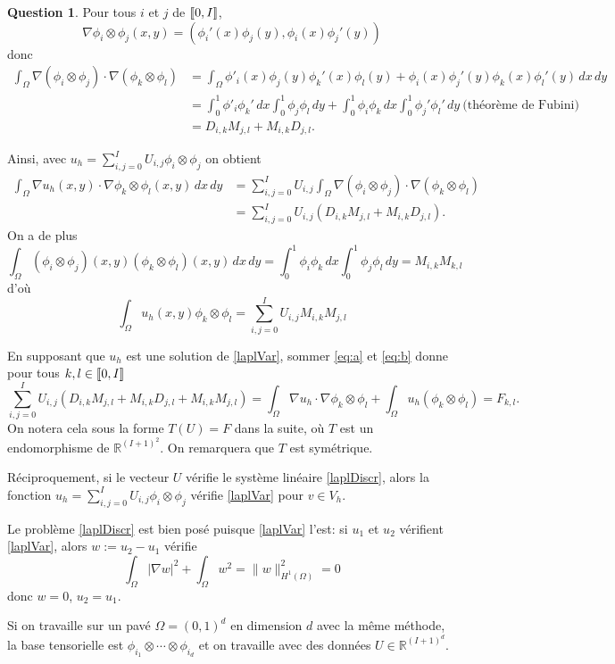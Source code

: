 \documentclass[11pt]{article}
\newcommand{\RR}{\mathbb{R}}
\DeclarePairedDelimiter{\zintcc}{[\![}{]\!]}
\theoremstyle{definition}
\newtheorem{ques}{Question}
\begin{document}
\begin{ques}
Pour tous $i$ et $j$ de $\zintcc{0,I}$,
\[
\nabla \phi_i\otimes\phi_j (x,y) = \left(
\phi_i'(x)\phi_j(y), \phi_i(x)\phi_j'(y)
\right)
\]
donc 
\begin{align*}
\int_{\Omega}\nabla(\phi_i\otimes\phi_j)\cdot\nabla(\phi_k\otimes\phi_l) 
&=
\int_{\Omega} \phi'_i(x)\phi_j(y)\phi_k'(x)\phi_l(y) + \phi_i(x)\phi_j'(y)\phi_k(x)\phi_l'(y)\,dx\,dy \\
&= \int_{0}^{1}\phi'_i\phi_k'\,dx\int_0^1\phi_j\phi_l\,dy + \int_{0}^{1}\phi_i\phi_k\,dx\int_0^1\phi_j'\phi_l'\,dy\ \text{(théorème de Fubini)} \\
&= D_{i,k}M_{j,l} + M_{i,k}D_{j,l}.
\end{align*}

Ainsi, avec $u_h = \sum_{i,j=0}^{I}U_{i,j}\phi_i\otimes\phi_j$ on obtient
\begin{align*}\tag{a}\label{eq:a}
\int_{\Omega} \nabla u_h(x,y)\cdot \nabla \phi_k\otimes\phi_l (x,y)\,dx\,dy 
&= \sum_{i,j=0}^{I}U_{i,j} \int_\Omega\nabla(\phi_i\otimes\phi_j)\cdot\nabla(\phi_k\otimes\phi_l) \\
&= \sum_{i,j=0}^{I}U_{i,j} (D_{i,k}M_{j,l}+M_{i,k}D_{j,l}).
\end{align*}
On a de plus
\[
\int_\Omega (\phi_i\otimes\phi_j)(x,y)(\phi_k\otimes\phi_l)(x,y)\,dx\,dy = \int_0^1 \phi_i \phi_k\,dx \int_0^1 \phi_j \phi_l\,dy = M_{i,k}M_{k,l}
\]
d'où
\begin{equation}\tag{b}\label{eq:b}
\int_\Omega u_h(x,y)\phi_k\otimes\phi_l = \sum_{i,j=0}^{I}U_{i,j}M_{i,k}M_{j,l}
\end{equation}

En supposant que $u_h$ est une solution de \eqref{laplVar}, sommer \eqref{eq:a} et \eqref{eq:b} donne pour tous $k,l\in\zintcc{0,I}$
\begin{equation}\label{laplDiscr}
\sum_{i,j=0}^{I}U_{i,j}(D_{i,k}M_{j,l} + M_{i,k}D_{j,l} + M_{i,k}M_{j,l}) =
\int_\Omega\nabla u_h\cdot \nabla\phi_k\otimes\phi_l + \int_\Omega u_h (\phi_k\otimes\phi_l)
= F_{k,l}.
\end{equation}
On notera cela sous la forme $T(U) = F$ dans la suite, où $T$ est un endomorphisme de $\RR^{(I+1)^2}$. On remarquera que $T$ est symétrique.

Réciproquement, si le vecteur $U$ vérifie le système linéaire \eqref{laplDiscr}, alors la fonction $u_h = \sum_{i,j=0}^{I}U_{i,j}\phi_i\otimes\phi_j$ vérifie \eqref{laplVar} pour $v\in V_h$.

Le problème \eqref{laplDiscr} est bien posé puisque \eqref{laplVar} l'est: si $u_1$ et $u_2$ vérifient \eqref{laplVar}, alors $w:= u_2-u_1$ vérifie
\[
\int_\Omega |\nabla w|^2 + \int_\Omega w^2 = \|w\|_{H^1(\Omega)}^2 = 0
\]
donc $w = 0$, $u_2 = u_1$.

Si on travaille sur un pavé $\Omega = (0,1)^d$ en dimension $d$ avec la même méthode, la base tensorielle est $\phi_{i_1}\otimes\cdots\otimes\phi_{i_d}$ et on travaille avec des données $U \in \RR^{(I+1)^d}$.

\end{ques}
\end{document}
